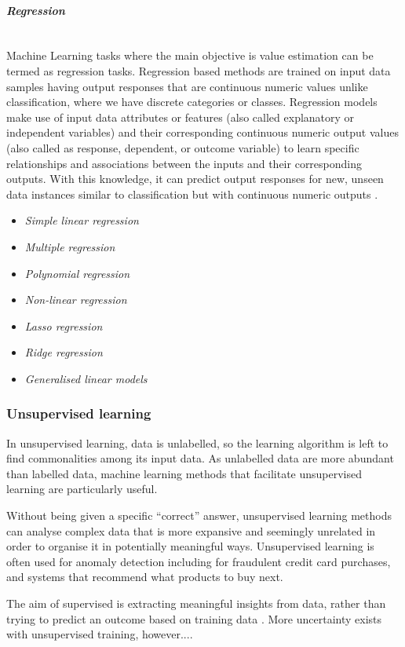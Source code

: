 \documentclass[12pt,a4paper]{article}
\newcommand{\myparagraph}[1]{\paragraph{#1}\mbox{}\\} %
\begin{document}
\myparagraph{\textit{Regression}}
Machine Learning tasks where the main objective is value estimation can be termed as regression tasks.
Regression based methods are trained on input data samples having output responses that are continuous
numeric values unlike classification, where we have discrete categories or classes. Regression models
make use of input data attributes or features (also called explanatory or independent variables) and their
corresponding continuous numeric output values (also called as response, dependent, or outcome variable)
to learn specific relationships and associations between the inputs and their corresponding outputs. With
this knowledge, it can predict output responses for new, unseen data instances similar to classification but
with continuous numeric outputs \cite{Kononenko2007}.

\begin{itemize}
    \item \textit{Simple linear regression}
    \item \textit{Multiple regression}
    \item \textit{Polynomial regression}
    \item \textit{Non-linear regression}
    \item \textit{Lasso regression}
    \item \textit{Ridge regression}
    \item \textit{Generalised linear models}
\end{itemize}

\subsubsection{Unsupervised learning}
In unsupervised learning, data is unlabelled, so the learning algorithm is left to find commonalities among its input data. As unlabelled data are more abundant than labelled data, machine learning methods that facilitate unsupervised learning are particularly useful.

Without being given a specific “correct” answer, unsupervised learning methods can analyse complex data that is more expansive and seemingly unrelated in order to organise it in potentially meaningful ways. Unsupervised learning is often used for anomaly detection including for fraudulent credit card purchases, and systems that recommend what products to buy next.

The aim of supervised is extracting meaningful insights from data, rather than trying to predict an outcome based on training data \cite{Kononenko2007}. More uncertainty exists with unsupervised training, however....
\end{document}
